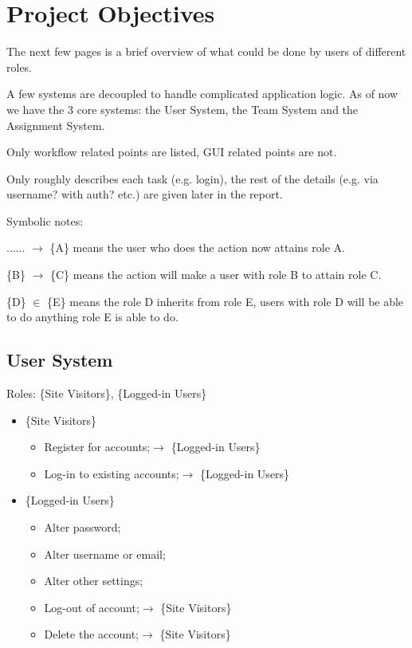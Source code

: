 \documentclass[12pt]{report}
\begin{document}
\section{Project Objectives} \label{overview.project-objectives}

The next few pages is a brief overview of what could be done by users of different roles.

A few systems are decoupled to handle complicated application logic.
As of now we have the 3 core systems: the User System, the Team System and the Assignment System.
\vspace{1 em}

Only workflow related points are listed, GUI related points are not.

Only roughly describes each task (e.g. login),
the rest of the details (e.g. via username? with auth? etc.) are given later in the report.
\vspace{1 em}

Symbolic notes:

...... $\rightarrow$ \{A\} means the user who does the action now attains role A.

\{B\} $\rightarrow$ \{C\} means the action will make a user with role B to attain role C.

\{D\} $\in$ \{E\} means the role D inherits from role E,
users with role D will be able to do anything role E is able to do.

\newpage
\subsection{User System} \label{overview.project-objectives.user-system}

Roles: \{Site Visitors\}, \{Logged-in Users\}

\begin{itemize}
	\item \{Site Visitors\}
	      \begin{itemize}
		      \item Register for accounts;\null\hfill $\rightarrow$ \{Logged-in Users\}
		      \item Log-in to existing accounts;\null\hfill $\rightarrow$ \{Logged-in Users\}
	      \end{itemize}
	\item \{Logged-in Users\}
	      \begin{itemize}
		      \item Alter password;
		      \item Alter username or email;
		      \item Alter other settings;
		      \item Log-out of account;\null\hfill $\rightarrow$ \{Site Visitors\}
		      \item Delete the account;\null\hfill $\rightarrow$ \{Site Visitors\}
	      \end{itemize}
\end{itemize}
\end{document}
